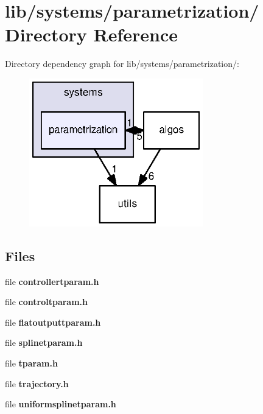 \section{lib/systems/parametrization/ \-Directory \-Reference}
\label{dir_561ed80c3b26cda5d11c33cb1fa4b6e6}
\-Directory dependency graph for lib/systems/parametrization/\-:
\nopagebreak
\begin{figure}[H]
\begin{center}
\leavevmode
\includegraphics[width=214pt]{dir_561ed80c3b26cda5d11c33cb1fa4b6e6_dep}
\end{center}
\end{figure}
\subsection*{\-Files}
\begin{DoxyCompactItemize}
\item 
file {\bf controllertparam.\-h}
\item 
file {\bf controltparam.\-h}
\item 
file {\bf flatoutputtparam.\-h}
\item 
file {\bf splinetparam.\-h}
\item 
file {\bf tparam.\-h}
\item 
file {\bf trajectory.\-h}
\item 
file {\bf uniformsplinetparam.\-h}
\end{DoxyCompactItemize}
